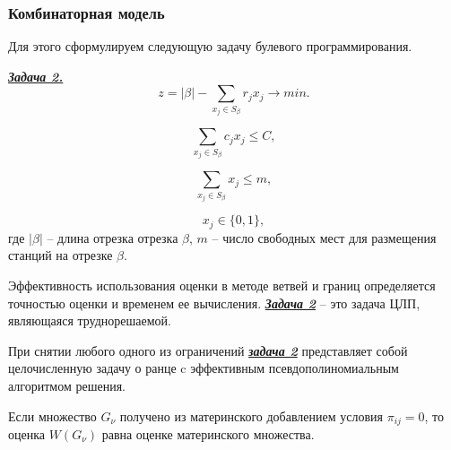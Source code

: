 \begin{frame}
    
    \frametitle{Комбинаторная модель}
    \fontsize{8pt}{7.2}\selectfont
    Для этого сформулируем следующую задачу булевого программирования.

    \underline{\textit{\textbf{Задача 2.}}}
    \begin{displaymath}\label{present:task2}
        z = |\beta| - \sum\limits_{x_j \in S_\beta} r_j x_j \rightarrow min.
    \end{displaymath}

    \begin{displaymath}\label{eq:part4_task2_cost}
        \sum\limits_{x_j \in S_\beta} c_j x_j \leqslant C,
    \end{displaymath}

    \begin{displaymath}\label{eq:part4_task2_m}
        \sum\limits_{x_j \in S_\beta} x_j \leqslant m,
    \end{displaymath}

    \begin{displaymath}
        x_j \in \{0, 1\},
    \end{displaymath}
    где $|\beta|$ -- длина отрезка отрезка  $\beta$, $m$ -- число свободных мест для размещения станций на отрезке $\beta$.

    \bigskip
    Эффективность использования оценки в методе ветвей и границ определяется точностью оценки и временем ее вычисления. \underline{\textit{\textbf{Задача 2}}} -- это задача ЦЛП, являющаяся труднорешаемой. 

    При снятии любого одного из ограничений \underline{\textit{\textbf{задача 2}}} представляет собой целочисленную задачу о ранце c эффективным псевдополиномиальным алгоритмом решения.
    
    \bigskip
    Если множество $G_\nu$ получено из материнского добавлением условия $\pi_{ij}=0$, то оценка $W(G_\nu)$ равна оценке материнского множества.

\end{frame}

